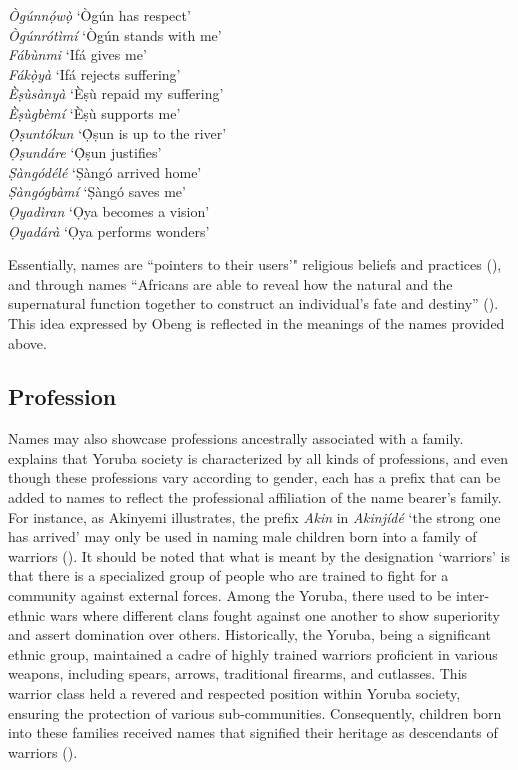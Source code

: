 \documentclass[output=paper,colorlinks,citecolor=brown]{langscibook}
\begin{document}
\ea \label{DietyNames}
\begin{xlist}
\ex	\textit{Ògúnnọ́wọ̀}		‘Ògún has respect’\\
\ex	\textit{Ògúnrótìmí}		‘Ògún stands with me’\\
\ex	\textit{Fábùnmi}		‘Ifá gives me’\\
\ex	\textit{Fákọ̀yà}		‘Ifá rejects suffering’ \\
\ex	\textit{Èṣùsànyà}		`Èṣù repaid my suffering’\\
\ex	\textit{Èṣùgbèmí}		‘Èṣù supports me’\\
\ex	\textit{Ọ̀ṣuntókun}		‘Ọ̀ṣun is up to the river’\\
\ex	\textit{Ọ̀ṣundáre}		‘Ọ̀ṣun justifies'\\
\ex	\textit{Ṣàngódélé}		‘Ṣàngó arrived home’\\
\ex	\textit{Ṣàngógbàmí}		‘Ṣàngó saves me’\\
\ex	\textit{Ọyadìran}		‘Ọya becomes a vision’\\
\ex	\textit{Ọyadárà}		‘Ọya performs wonders’\\
\end{xlist}
\z

Essentially, names are ``pointers to their users'" religious beliefs and practices (\cite[144]{Obeng2001}), and through names ``Africans are able to reveal how the natural and the supernatural function together to construct an individual’s fate and destiny'' (\cite[144]{Obeng2001}). This idea expressed by Obeng is reflected in the meanings of the names provided above. 

\subsection{Profession}

Names may also showcase professions ancestrally associated with a family. \citet[118]{Akinyemi2005} explains that Yoruba society is characterized by all kinds of professions, and even though these professions vary according to gender, each has a prefix that can be added to names to reflect the professional affiliation of the name bearer's family. For instance, as Akinyemi illustrates, the prefix \textit{Akin} in \textit{Akinjídé} ‘the strong one has arrived’ may only be used in naming male children born into a family of warriors (\citealt[118]{Akinyemi2005}). It should be noted that what is meant by the designation ‘warriors’ is that there is a specialized group of people who are trained to fight for a community against external forces. Among the Yoruba, there used to be inter-ethnic wars where different clans fought against one another to show superiority and assert domination over others. Historically, the Yoruba, being a significant ethnic group, maintained a cadre of highly trained warriors proficient in various weapons, including spears, arrows, traditional firearms, and cutlasses. This warrior class held a revered and respected position within Yoruba society, ensuring the protection of various sub-communities. Consequently, children born into these families received names that signified their heritage as descendants of warriors (\cite{Ehineni2019}). 
\end{document}
